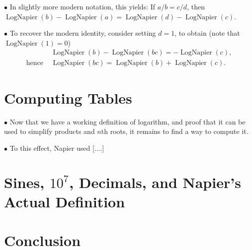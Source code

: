 \documentclass{article}
\newcommand\point[1]{\noindent \hspace{\labelsep} $\bullet$ #1 \smallskip}
\DeclareMathOperator{\lognap}{LogNapier}
\begin{document}
\point{In slightly more modern notation, this yields: If $a/b = c/d$, then $\lognap(b)-\lognap(a) = \lognap(d)-\lognap(c)$.}

\point{To recover the modern identity, consider setting $d = 1$, to obtain (note that $\lognap(1) = 0$)
\begin{align}
&\lognap(b) - \lognap(bc) = -\lognap(c),\\
\text{hence } &\lognap(bc) = \lognap(b) + \lognap(c).
\end{align}}

\section{Computing Tables}

\point{Now that we have a working definition of logarithm, and proof that it can be used to simplify products and $n$th roots, it remains to find a way to compute it.}

\point{To this effect, Napier used [....]}

\section{Sines, $10^7$, Decimals, and Napier's Actual Definition}

\section{Conclusion}
\end{document}
